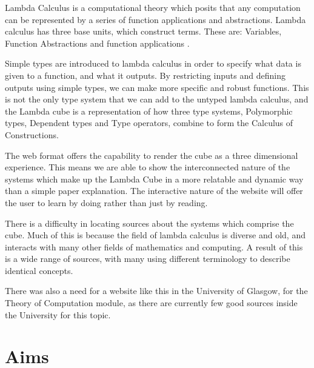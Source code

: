 \documentclass{l4proj}
\begin{document}
Lambda Calculus is a computational theory which posits that any computation can be represented by a series of function applications and abstractions.  Lambda calculus has three base units, which construct terms.  These are: Variables, Function Abstractions and function applications .

Simple types are introduced to lambda calculus in order to specify what data is given to a function, and what it outputs. By restricting inputs and defining outputs using simple types, we can make more specific and robust functions.  This is not the only type system that we can add to the untyped lambda calculus, and the Lambda cube is a representation of how three type systems, Polymorphic types, Dependent types and Type operators, combine to form the Calculus of Constructions.

The web format offers the capability to render the cube as a three dimensional experience. This means we are able to show the interconnected nature of the systems which make up the Lambda Cube in a more relatable and dynamic way than a simple paper explanation.  The interactive nature of the website will offer the user to learn by doing rather than just by reading.

There is a difficulty in locating sources about the systems which comprise the cube.  Much of this is because the field of lambda calculus is diverse and old, and interacts with many other fields of mathematics and computing.  A result of this is a wide range of sources, with many using different terminology to describe identical concepts.

There was also a need for a website like this in the University of Glasgow, for the Theory of Computation module, as there are currently few good sources inside the University for this topic.

\section{Aims}
\end{document}
